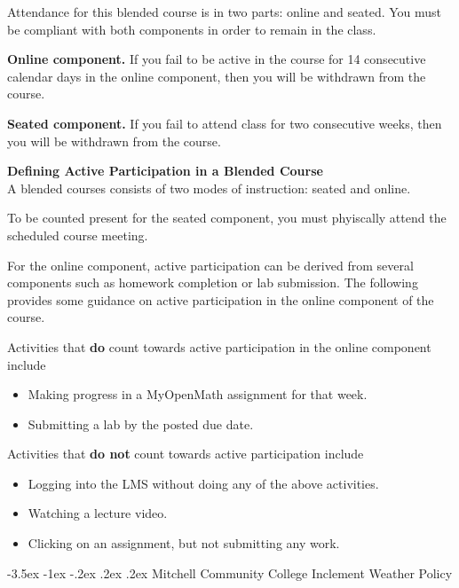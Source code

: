 \documentclass{article}
\makeatletter
\renewcommand\section{\@startsection{section}{1}{0pt}%
  {-3.5ex \@plus -1ex \@minus -.2ex}%
  {.2ex \@plus.2ex}%
  {\normalfont\Large\bfseries}} %
\renewenvironment{framed}[1][]{%
  \def\FrameCommand{%
    \hspace{1pt}%
    {\color{mybordercolor}\vrule width 2pt} %
    \hspace{1pt}%
    \fboxsep=\FrameSep%
    \colorbox{mybgcolor}%
  }%
  \MakeFramed {\advance\hsize-\width \FrameRestore}%
}{%
  \endMakeFramed
}
\makeatother
\begin{document}
Attendance for this blended course is in two parts: online and seated.  You must be compliant with both components in order to remain in the class.

\textbf{Online component.} If you fail to be active in the course for 14 consecutive calendar days in the online component, then you will be withdrawn from the course.

\textbf{Seated component.} If you fail to attend class for two consecutive weeks, then you will be withdrawn from the course.

\begin{framed}
\textbf{Defining Active Participation in a Blended Course}\\
A blended courses consists of two modes of instruction: seated and online.

To be counted present for the seated component, you must phyiscally attend the scheduled course meeting.

For the online component, active participation can be derived from several components such as homework completion or lab submission. The following provides some guidance on active participation in the online component of the course.

Activities that \textbf{do} count towards active participation in the online component include

\begin{itemize}
\item Making progress in a MyOpenMath assignment for that week.
\item Submitting a lab by the posted due date.
\end{itemize}

Activities that \textbf{do not} count towards active participation include

\begin{itemize}
\item Logging into the LMS without doing any of the above activities.
\item Watching a lecture video.
\item Clicking on an assignment, but not submitting any work.
\end{itemize}
\end{framed}

\section{Mitchell Community College Inclement Weather Policy}
\end{document}
